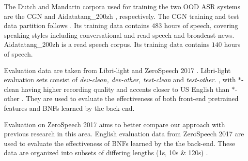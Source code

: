 \documentclass[a4paper]{article}
\begin{document}
The Dutch and Mandarin corpora used for training the two OOD ASR systems are the CGN \cite{oostdijk2000spoken} and Aidatatang\_200zh \cite{aidatatang}, respectively. 
The CGN   training and test data partition follows \cite{laurensw75cgn_kaldi}. Its training data contains $483$ hours of speech, covering speaking styles including conversational and read speech and broadcast news.
Aidatatang\_200zh is a read speech   corpus.
Its training data contains $140$ hours of speech.   

Evaluation data are taken from  Libri-light and ZeroSpeech 2017 \cite{dunbar2017zero}. 
 Libri-light evaluation sets consist of \textit{dev-clean, dev-other, test-clean} and \textit{test-other}.
 , with $*$-clean  having higher recording quality and accents closer to US English than   $*$-other
 \cite{panayotov2015librispeech}. They are used to evaluate the effectiveness of  both front-end pretrained features and  BNFs learned by the back-end.

Evaluation on ZeroSpeech 2017 aims  to better compare our approach with previous research in this area.
English evaluation data from ZeroSpeech 2017 are used to evaluate the effectiveness of BNFs learned by the the back-end. These data are organized into subsets of differing   lengths (1s, 10s \& 120s)  \cite{dunbar2017zero}.

\end{document}
